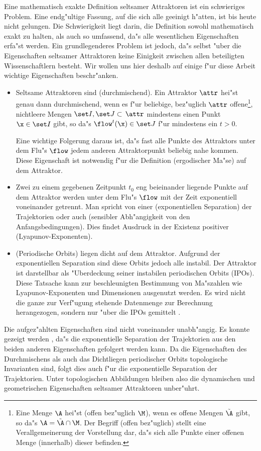 Eine mathematisch exakte Definition seltsamer Attraktoren ist ein schwieriges
Problem. Eine endg"ultige Fassung, auf die sich alle geeinigt h"atten, ist bis heute nicht
gelungen. Die Schwierigkeit liegt darin, die Definition sowohl
mathematisch exakt zu halten, als auch so umfassend, da"s alle wesentlichen Eigenschaften
erfa"st werden. Ein grundlegenderes Problem ist jedoch, da"s selbst "uber die
Eigenschaften seltsamer Attraktoren keine Einigkeit zwischen allen beteiligten Wissenschaftlern
besteht. Wir wollen uns hier deshalb auf einige f"ur diese 
Arbeit wichtige Eigenschaften beschr"anken. 
\begin{itemize}

\item Seltsame Attraktoren sind \begriff(durchmischend). 
Ein Attraktor $\attr$  hei"st genau dann durchmischend, wenn es f"ur beliebige,
bez"uglich $\attr$ offene\footnote{Eine Menge $\A$ hei"st 
\begriff(offen bez"uglich $\M$), wenn es offene Mengen $\tilde\A$ gibt, so
da"s $\A=\tilde\A\cap\M$. Der Begriff \naja(offen bez"uglich) stellt eine
Verallgemeinerung der Vorstellung dar, da"s sich alle Punkte einer offenen Menge
\naja(innerhalb) dieser befinden.}, nichtleere  Mengen $\set I,\set J\subset\,\attr$
mindestens einen Punkt $\x\in\set I$ gibt, so da"s $\flow^t(\x)\in\set J$ f"ur mindestens
ein $t>0$.   

Eine wichtige Folgerung daraus ist, da"s fast alle Punkte
des Attraktors unter dem Flu"s $\flow$ jedem anderen Attraktorpunkt beliebig nahe
kommen. Diese Eigenschaft ist notwendig f"ur die Definition \begriff(ergodischer Ma"se)
auf dem Attraktor. 

\item Zwei zu einem gegebenen Zeitpunkt $t_0$ eng beieinander liegende Punkte auf dem Attraktor
werden unter dem Flu"s $\flow$ mit der Zeit exponentiell voneinander getrennt. Man spricht von einer 
\begriff(exponentiellen Separation) der Trajektorien oder auch \begriff(sensibler
Abh"angigkeit von den Anfangsbedingungen). Dies findet Ausdruck in der Existenz positiver
\begriff(Lyapunov-Exponenten).

\item \begriff(Periodische Orbits) liegen dicht auf dem Attraktor. Aufgrund der
exponentiellen Separation sind diese Orbits jedoch alle instabil. Der Attraktor ist
darstellbar als "Uberdeckung seiner instabilen periodischen Orbits (IPOs). Diese Tatsache
kann zur beschleunigten Bestimmung von Ma"szahlen wie Lyapunov-Exponenten und
Dimensionen ausgenutzt werden. Es wird nicht die ganze zur Verf"ugung stehende Datenmenge
zur Berechnung herangezogen, sondern nur "uber die IPOs gemittelt \cite{Pawelzik91,Pawelzik91a}.
\end{itemize}
Die aufgez"ahlten Eigenschaften sind nicht voneinander unabh"angig. Es konnte gezeigt
werden \cite{Banks92}, da"s die exponentielle Separation der Trajektorien aus den beiden anderen
Eigenschaften gefolgert werden kann. Da die Eigenschaften des Durchmischens als auch
das Dichtliegen periodischer Orbits topologische Invarianten sind, folgt dies auch f"ur
die exponentielle Separation der Trajektorien. Unter topologischen Abbildungen bleiben also die dynamischen 
und geometrischen Eigenschaften seltsamer Attraktoren unber"uhrt.

